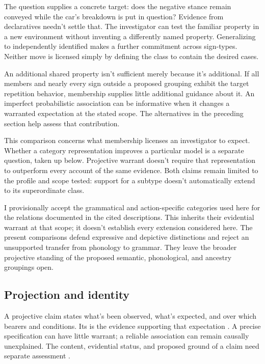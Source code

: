\documentclass[12pt]{article}
\begin{document}
The question supplies a concrete target: does the negative stance
remain conveyed while the car's breakdown is put in question? Evidence
from declaratives needn't settle that. The investigator can test the
familiar property in a new environment without inventing a differently
named property. Generalizing to independently identified 
makes a further commitment across sign-types. Neither move is licensed
simply by defining the class to contain the desired cases.

An additional shared property isn't sufficient merely because it's
additional. If all members and nearly every sign outside a proposed
grouping exhibit the target repetition behavior, membership supplies
little additional guidance about it. An imperfect probabilistic association can be
informative when it changes a warranted expectation at the stated
scope. The alternatives in the preceding section help assess that
contribution.

This comparison concerns what membership licenses an investigator to
expect. Whether a category representation improves a particular model
is a separate question, taken up below. Projective warrant doesn't
require that representation to outperform every account of the same
evidence. Both claims remain limited to the profile and scope tested:
support for a subtype doesn't automatically extend to its superordinate
class.

I provisionally accept the grammatical and action-specific categories
used here for the relations documented in the cited descriptions.
This inherits their evidential warrant at that scope; it doesn't
establish every extension considered here. The present comparisons
defend expressive and depictive distinctions and reject an unsupported
transfer from phonology to grammar. They leave the broader projective
standing of the proposed semantic, phonological, and ancestry groupings
open.

\subsection{Projection and identity}

A projective claim states what's been observed, what's expected, and
over which bearers and conditions. Its  is the evidence
supporting that expectation \citep{Goodman1955}. A precise specification
can have little warrant; a reliable association can remain causally
unexplained. The content, evidential status, and proposed ground of a
claim need separate assessment
\citep[11--12]{reynolds2026projectibilityHistory}.
\end{document}
